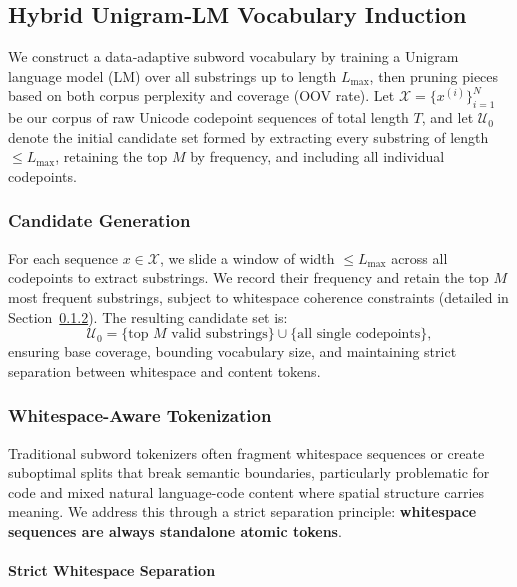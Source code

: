 \subsection{Hybrid Unigram‐LM Vocabulary Induction}
\label{sec:vocab-induction}

We construct a data‐adaptive subword vocabulary by training a Unigram language model (LM) over all substrings up to length \(L_{\max}\), then pruning pieces based on both corpus perplexity and coverage (OOV rate). Let
\(\mathcal X = \{x^{(i)}\}_{i=1}^N\)
be our corpus of raw Unicode codepoint sequences of total length \(T\), and let \(\mathcal U_{0}\) denote the initial candidate set formed by extracting every substring of length \(\le L_{\max}\), retaining the top \(M\) by frequency, and including all individual codepoints.

\subsubsection{Candidate Generation}

For each sequence \(x \in \mathcal X\), we slide a window of width \(\le L_{\max}\) across all codepoints to extract substrings. We record their frequency and retain the top \(M\) most frequent substrings, subject to whitespace coherence constraints (detailed in Section~\ref{sec:whitespace-tokenization}). The resulting candidate set is:
\[
\mathcal U_{0}
= \{\text{top }M\text{ valid substrings}\} \cup \{\text{all single codepoints}\},
\]
ensuring base coverage, bounding vocabulary size, and maintaining strict separation between whitespace and content tokens.

\subsubsection{Whitespace-Aware Tokenization}
\label{sec:whitespace-tokenization}

Traditional subword tokenizers often fragment whitespace sequences or create suboptimal splits that break semantic boundaries, particularly problematic for code and mixed natural language-code content where spatial structure carries meaning. We address this through a strict separation principle: \textbf{whitespace sequences are always standalone atomic tokens}.

\paragraph{Strict Whitespace Separation}

